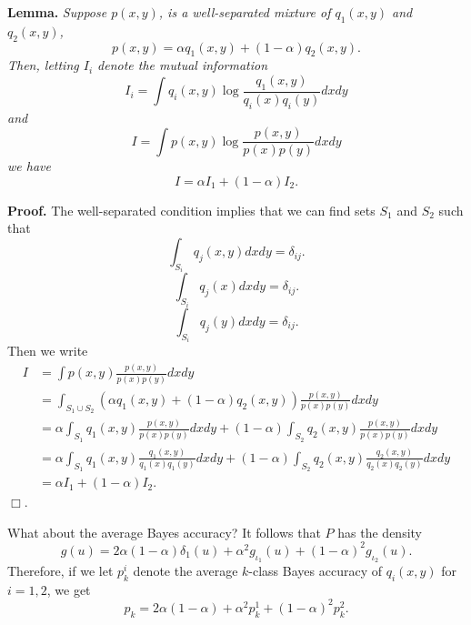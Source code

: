 \documentclass[12pt]{article}
\begin{document}
\noindent\textbf{Lemma.}\emph{
Suppose $p(x, y)$, is a well-separated mixture of $q_1(x, y)$ and $q_2(x, y)$,
\[
p(x, y) = \alpha q_1(x, y) + (1-\alpha) q_2(x, y).
\]
Then, letting $I_i$ denote the mutual information
\[
I_i = \int q_i(x, y) \log \frac{q_1(x, y)}{q_i(x) q_i(y)} dx dy
\]
and
\[
I = \int p(x, y) \log \frac{p(x, y)}{p(x) p(y)} dx dy
\]
we have
\[
I = \alpha I_1 + (1-\alpha) I_2.
\]
}

\noindent\textbf{Proof.}
The well-separated condition implies that we can find sets $S_1$ and $S_2$ such that
\[
\int_{S_i} q_j(x, y) dx dy = \delta_{ij}.
\]
\[
\int_{S_i} q_j(x) dx dy = \delta_{ij}.
\]
\[
\int_{S_i} q_j(y) dx dy = \delta_{ij}.
\]
Then we write
\begin{align*}
I &= \int p(x, y) \frac{p(x, y)}{p(x)p(y)}dx dy
\\&= \int_{S_1 \cup S_2} (\alpha q_1(x, y) + (1-\alpha) q_2(x, y))\frac{p(x, y)}{p(x)p(y)}dx dy
\\&= \alpha \int_{S_1}q_1(x, y) \frac{p(x, y)}{p(x)p(y)}dx dy + (1-\alpha) \int_{S_2}q_2(x, y) \frac{p(x, y)}{p(x)p(y)}dx dy
\\&= \alpha \int_{S_1}q_1(x, y) \frac{q_1(x, y)}{q_1(x)q_1(y)}dx dy + (1-\alpha) \int_{S_2}q_2(x, y) \frac{q_2(x, y)}{q_2(x)q_2(y)}dx dy\\&= \alpha I_1 + (1-\alpha) I_2.
\end{align*}
$\Box$.

What about the average Bayes accuracy?
It follows that $P$ has the density
\[
g(u) = 2\alpha(1-\alpha)\delta_1(u) + \alpha^2 g_{\iota_1}(u) + (1-\alpha)^2 g_{\iota_2}(u).
\]
Therefore, if we let $p_k^i$ denote the average $k$-class Bayes accuracy of $q_i(x, y)$ for $i = 1,2$, we get
\[
p_k = 2\alpha(1-\alpha) + \alpha^2 p_k^1 + (1-\alpha)^2 p_k^2.
\]
\end{document}
